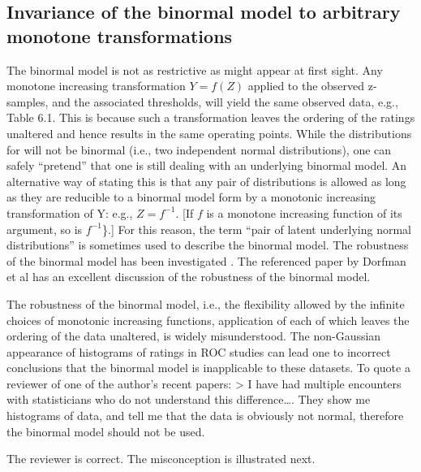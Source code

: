 \documentclass[
]{book}
\begin{document}
\hypertarget{invariance-of-the-binormal-model-to-arbitrary-monotone-transformations}{%
\subsection{Invariance of the binormal model to arbitrary monotone transformations}\label{invariance-of-the-binormal-model-to-arbitrary-monotone-transformations}}

The binormal model is not as restrictive as might appear at first sight. Any monotone increasing transformation \(Y=f(Z)\) applied to the observed z-samples, and the associated thresholds, will yield the same observed data, e.g., Table 6.1. This is because such a transformation leaves the ordering of the ratings unaltered and hence results in the same operating points. While the distributions for will not be binormal (i.e., two independent normal distributions), one can safely ``pretend'' that one is still dealing with an underlying binormal model. An alternative way of stating this is that any pair of distributions is allowed as long as they are reducible to a binormal model form by a monotonic increasing transformation of Y: e.g., \(Z=f^{-1}\). {[}If \(f\) is a monotone increasing function of its argument, so is \(f^{-1}\)\}.{]} For this reason, the term ``pair of latent underlying normal distributions'' is sometimes used to describe the binormal model. The robustness of the binormal model has been investigated \citep{RN1216, RN100}. The referenced paper by Dorfman et al has an excellent discussion of the robustness of the binormal model.

The robustness of the binormal model, i.e., the flexibility allowed by the infinite choices of monotonic increasing functions, application of each of which leaves the ordering of the data unaltered, is widely misunderstood. The non-Gaussian appearance of histograms of ratings in ROC studies can lead one to incorrect conclusions that the binormal model is inapplicable to these datasets. To quote a reviewer of one of the author's recent papers:
\textgreater{} I have had multiple encounters with statisticians who do not understand this difference\ldots. They show me histograms of data, and tell me that the data is obviously not normal, therefore the binormal model should not be used.

The reviewer is correct. The misconception is illustrated next.
\end{document}
